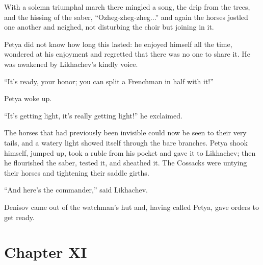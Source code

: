 With a solemn triumphal march there mingled a song, the drip from
the trees, and the hissing of the saber, ``Ozheg-zheg-zheg...''
and again the horses jostled one another and neighed, not
disturbing the choir but joining in it.

Petya did not know how long this lasted: he enjoyed himself all
the time, wondered at his enjoyment and regretted that there was
no one to share it. He was awakened by Likhachev's kindly voice.

``It's ready, your honor; you can split a Frenchman in half with
it!''

Petya woke up.

``It's getting light, it's really getting light!'' he exclaimed.

The horses that had previously been invisible could now be seen
to their very tails, and a watery light showed itself through the
bare branches.  Petya shook himself, jumped up, took a ruble from
his pocket and gave it to Likhachev; then he flourished the
saber, tested it, and sheathed it.  The Cossacks were untying
their horses and tightening their saddle girths.

``And here's the commander,'' said Likhachev.

Denisov came out of the watchman's hut and, having called Petya,
gave orders to get ready.


\chapter*{Chapter XI} \ifaudio {}
\fi

